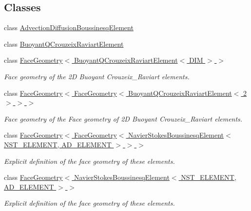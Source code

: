 \subsection*{Classes}
\begin{DoxyCompactItemize}
\item 
class \hyperlink{classoomph_1_1AdvectionDiffusionBoussinesqElement}{Advection\+Diffusion\+Boussinesq\+Element}
\item 
class \hyperlink{classoomph_1_1BuoyantQCrouzeixRaviartElement}{Buoyant\+Q\+Crouzeix\+Raviart\+Element}
\item 
class \hyperlink{classoomph_1_1FaceGeometry_3_01BuoyantQCrouzeixRaviartElement_3_01DIM_01_4_01_4}{Face\+Geometry$<$ Buoyant\+Q\+Crouzeix\+Raviart\+Element$<$ D\+I\+M $>$ $>$}
\begin{DoxyCompactList}\small\item\em Face geometry of the 2D Buoyant Crouzeix\+\_\+\+Raviart elements. \end{DoxyCompactList}\item 
class \hyperlink{classoomph_1_1FaceGeometry_3_01FaceGeometry_3_01BuoyantQCrouzeixRaviartElement_3_012_01_4_01_4_01_4}{Face\+Geometry$<$ Face\+Geometry$<$ Buoyant\+Q\+Crouzeix\+Raviart\+Element$<$ 2 $>$ $>$ $>$}
\begin{DoxyCompactList}\small\item\em Face geometry of the Face geometry of 2D Buoyant Crouzeix\+\_\+\+Raviart elements. \end{DoxyCompactList}\item 
class \hyperlink{classoomph_1_1FaceGeometry_3_01FaceGeometry_3_01NavierStokesBoussinesqElement_3_01NST__ELEMENT_00_01AD__ELEMENT_01_4_01_4_01_4}{Face\+Geometry$<$ Face\+Geometry$<$ Navier\+Stokes\+Boussinesq\+Element$<$ N\+S\+T\+\_\+\+E\+L\+E\+M\+E\+N\+T, A\+D\+\_\+\+E\+L\+E\+M\+E\+N\+T $>$ $>$ $>$}
\begin{DoxyCompactList}\small\item\em Explicit definition of the face geometry of these elements. \end{DoxyCompactList}\item 
class \hyperlink{classoomph_1_1FaceGeometry_3_01NavierStokesBoussinesqElement_3_01NST__ELEMENT_00_01AD__ELEMENT_01_4_01_4}{Face\+Geometry$<$ Navier\+Stokes\+Boussinesq\+Element$<$ N\+S\+T\+\_\+\+E\+L\+E\+M\+E\+N\+T, A\+D\+\_\+\+E\+L\+E\+M\+E\+N\+T $>$ $>$}
\begin{DoxyCompactList}\small\item\em Explicit definition of the face geometry of these elements. \end{DoxyCompactList}\item 

\end{DoxyCompactItemize}
